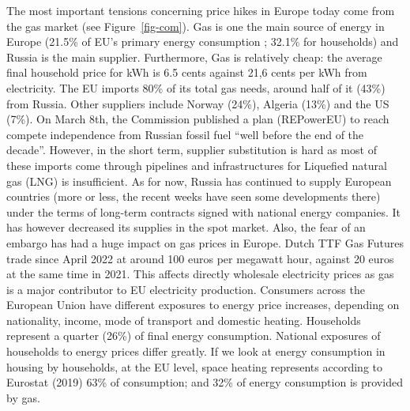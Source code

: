 \documentclass[
  9pt,
  a4paper,
  numbers=noendperiod,
  DIV=12]{scrartcl}
\begin{document}
The most important tensions concerning price hikes in Europe today come
from the gas market (see Figure~\ref{fig-com}). Gas is one the main
source of energy in Europe (21.5\% of EU's primary energy consumption ;
32.1\% for households) and Russia is the main supplier. Furthermore, Gas
is relatively cheap: the average final household price for kWh is 6.5
cents against 21,6 cents per kWh from electricity. The EU imports 80\%
of its total gas needs, around half of it (43\%) from Russia. Other
suppliers include Norway (24\%), Algeria (13\%) and the US (7\%). On
March 8th, the Commission published a plan (REPowerEU) to reach compete
independence from Russian fossil fuel ``well before the end of the
decade''. However, in the short term, supplier substitution is hard as
most of these imports come through pipelines and infrastructures for
Liquefied natural gas (LNG) is insufficient. As for now, Russia has
continued to supply European countries (more or less, the recent weeks
have seen some developments there) under the terms of long-term
contracts signed with national energy companies. It has however
decreased its supplies in the spot market. Also, the fear of an embargo
has had a huge impact on gas prices in Europe. Dutch TTF Gas Futures
trade since April 2022 at around 100 euros per megawatt hour, against 20
euros at the same time in 2021. This affects directly wholesale
electricity prices as gas is a major contributor to EU electricity
production. Consumers across the European Union have different exposures
to energy price increases, depending on nationality, income, mode of
transport and domestic heating. Households represent a quarter (26\%) of
final energy consumption. National exposures of households to energy
prices differ greatly. If we look at energy consumption in housing by
households, at the EU level, space heating represents according to
Eurostat (2019) 63\% of consumption; and 32\% of energy consumption is
provided by gas.
\end{document}
